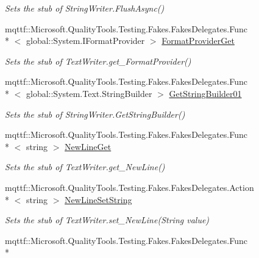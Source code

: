 \begin{DoxyCompactItemize}
\begin{DoxyCompactList}\small\item\em Sets the stub of String\-Writer.\-Flush\-Async()\end{DoxyCompactList}\item 
mqttf\-::\-Microsoft.\-Quality\-Tools.\-Testing.\-Fakes.\-Fakes\-Delegates.\-Func\\*
$<$ global\-::\-System.\-I\-Format\-Provider $>$ \hyperlink{class_system_1_1_i_o_1_1_fakes_1_1_stub_string_writer_afc0e19fc6a0db335d6698c5d13254d0b}{Format\-Provider\-Get}
\begin{DoxyCompactList}\small\item\em Sets the stub of Text\-Writer.\-get\-\_\-\-Format\-Provider()\end{DoxyCompactList}\item 
mqttf\-::\-Microsoft.\-Quality\-Tools.\-Testing.\-Fakes.\-Fakes\-Delegates.\-Func\\*
$<$ global\-::\-System.\-Text.\-String\-Builder $>$ \hyperlink{class_system_1_1_i_o_1_1_fakes_1_1_stub_string_writer_a032bd2d99dca4c697b02506aded113d2}{Get\-String\-Builder01}
\begin{DoxyCompactList}\small\item\em Sets the stub of String\-Writer.\-Get\-String\-Builder()\end{DoxyCompactList}\item 
mqttf\-::\-Microsoft.\-Quality\-Tools.\-Testing.\-Fakes.\-Fakes\-Delegates.\-Func\\*
$<$ string $>$ \hyperlink{class_system_1_1_i_o_1_1_fakes_1_1_stub_string_writer_a301e5c1bbe6109cc4e0f993b0619c2b7}{New\-Line\-Get}
\begin{DoxyCompactList}\small\item\em Sets the stub of Text\-Writer.\-get\-\_\-\-New\-Line()\end{DoxyCompactList}\item 
mqttf\-::\-Microsoft.\-Quality\-Tools.\-Testing.\-Fakes.\-Fakes\-Delegates.\-Action\\*
$<$ string $>$ \hyperlink{class_system_1_1_i_o_1_1_fakes_1_1_stub_string_writer_a8c0ed1c0432c215d8e3522ad7c4f1461}{New\-Line\-Set\-String}
\begin{DoxyCompactList}\small\item\em Sets the stub of Text\-Writer.\-set\-\_\-\-New\-Line(\-String value)\end{DoxyCompactList}\item 
mqttf\-::\-Microsoft.\-Quality\-Tools.\-Testing.\-Fakes.\-Fakes\-Delegates.\-Func\\*

\end{DoxyCompactItemize}
